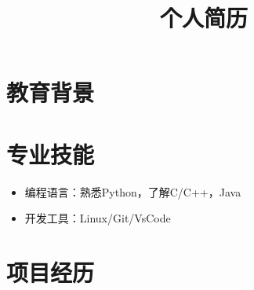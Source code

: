\documentclass[10pt,a4paper,sans]{moderncv} %
\title{个人简历}
\begin{document}
\makecvtitle %



\section{教育背景}




\section{专业技能}
\begin{itemize}
\setlength{\itemindent}{2em}
   \item 编程语言：熟悉Python，了解C/C++，Java
  	\item 开发工具：Linux/Git/VsCode
\end{itemize}


\section{项目经历}
\end{document}
